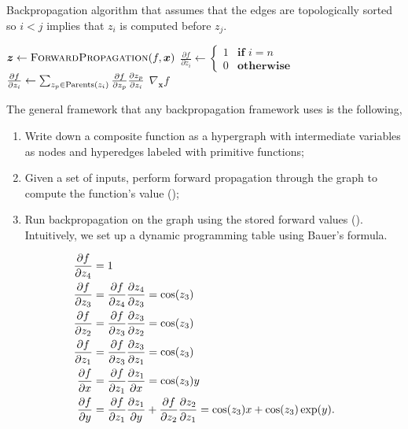 \begin{algorithm}
    \caption{Backpropagation algorithm that assumes that the edges are
        topologically sorted so $i<j$ implies that $z_i$ is computed before $z_j$.}
    \label{alg:backpropagation}

    \begin{algorithmic}[1]
        \State $\bm{z} \gets \Call{ForwardPropagation}{f,\bm{x}}$
        \State $\frac{\partial f}{\partial z_i} \gets \begin{cases}
                1 & \textbf{if } i=n   \\
                0 & \textbf{otherwise}
            \end{cases}$ 
         
        \State $\pdv{f}{z_i} \gets \sum_{z_p\in\mathrm{Parents}(z_i)} \pdv{f}{z_p} \pdv{z_p}{z_i}$ 
        \EndFor
        \State \Return $\nabla_{\bm{x}} f$
        \EndFunction
    \end{algorithmic}
\end{algorithm}

The general framework that any backpropagation framework uses is the following,
\begin{enumerate}
    \item Write down a composite function as a hypergraph with intermediate
          variables as nodes and hyperedges labeled with primitive functions;
    \item Given a set of inputs, perform forward propagation through the graph to
          compute the function's value ();
    \item Run backpropagation on the graph using the stored forward values
          (). Intuitively, we set up a dynamic programming
          table using Bauer's formula.
\end{enumerate}

\begin{example}
    \begin{align*}
        \pdv{f}{z_4} & = 1                                                                                          \\
        \pdv{f}{z_3} & = \pdv{f}{z_4} \pdv{z_4}{z_3} = \cos(z_3)                                                    \\
        \pdv{f}{z_2} & = \pdv{f}{z_3} \pdv{z_3}{z_2} = \cos(z_3)                                                    \\
        \pdv{f}{z_1} & = \pdv{f}{z_3} \pdv{z_3}{z_1} = \cos(z_3)                                                    \\
        \pdv{f}{x}   & = \pdv{f}{z_1} \pdv{z_1}{x} = \cos(z_3) y                                                    \\
        \pdv{f}{y}   & = \pdv{f}{z_1} \pdv{z_1}{y} + \pdv{f}{z_2} \pdv{z_2}{z_1} = \cos(z_3) x + \cos(z_3) \exp(y).
    \end{align*}
\end{example}
